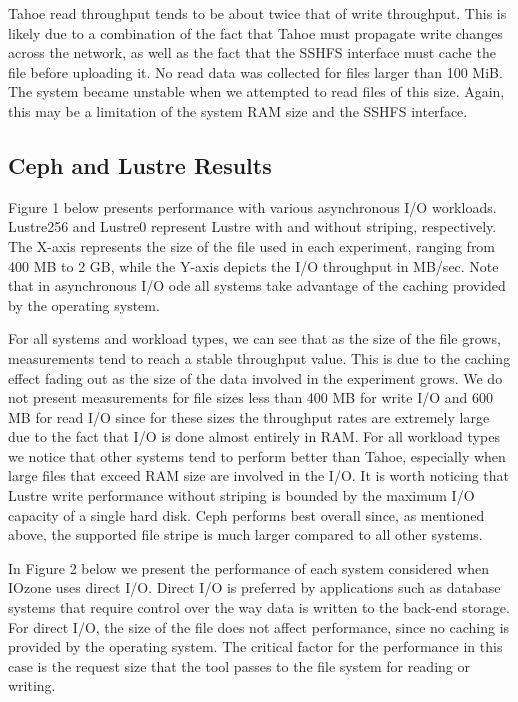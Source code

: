 \documentclass[11pt]{article}
\begin{document}
Tahoe read throughput tends to be about twice that of write
throughput. This is likely due to a combination of the fact that Tahoe
must propagate write changes across the network, as well as the fact
that the SSHFS interface must cache the file before uploading it. No
read data was collected for files larger than 100 MiB. The system
became unstable when we attempted to read files of this size. Again,
this may be a limitation of the system RAM size and the SSHFS interface.

\subsection{Ceph and Lustre Results}
Figure 1 below presents performance with various asynchronous I/O 
workloads. Lustre256 and Lustre0 represent Lustre with and without 
striping, respectively. The X-axis represents the size of the file 
used in each experiment, ranging from 400 MB to 2 GB, while the Y-axis 
depicts the I/O throughput in MB/sec. Note that in asynchronous I/O 
ode all systems take advantage of the caching provided by the operating 
system.


For all systems and workload types, we can see that as the size 
of the file grows, measurements tend to reach a stable throughput value. This 
is due to the caching effect fading out as the size of the data involved in 
the experiment grows. We do not present measurements for file sizes less than 
400 MB for write I/O and 600 MB for read I/O since for these sizes the 
throughput rates are extremely large due to the fact that I/O is done almost 
entirely in RAM. For all workload types we notice that other systems tend to 
perform better than Tahoe, especially when large files that exceed RAM size 
are involved in the I/O. It is worth noticing that Lustre write performance 
without striping is bounded by the maximum I/O capacity of a single hard disk. 
Ceph performs best overall since, as mentioned above, the supported file stripe 
is much larger compared to all other systems.

In Figure 2 below we present the performance of each system considered when 
IOzone uses direct I/O. Direct I/O is preferred by applications such as 
database systems that require control over the way data is written to the 
back-end storage. For direct I/O, the size of the file does not affect 
performance, since no caching is provided by the operating system. The 
critical factor for the performance in this case is the request size that 
the tool passes to the file system for reading or writing.
\end{document}

